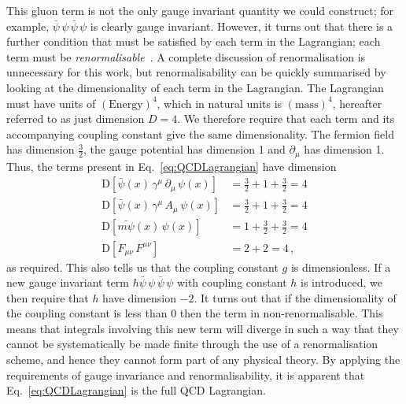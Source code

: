 This gluon term is not the only gauge invariant quantity we could construct; for example, $\bar{\psi}\,\psi\,\bar{\psi}\,\psi$ is clearly gauge invariant. However, it turns out that there is a further condition that must be satisfied by each term in the Lagrangian; each term must be \textit{renormalisable}~\cite{peskin2018introduction}. A complete discussion of renormalisation is unnecessary for this work, but renormalisability can be quickly summarised by looking at the dimensionality of each term in the Lagrangian. The Lagrangian must have units of $(\text{Energy})^4$, which in natural units is $(\text{mass})^4$,  hereafter referred to as just dimension $D=4$. We therefore require that each term and its accompanying coupling constant give the same dimensionality. The fermion field has dimension $\frac{3}{2}$, the gauge potential has dimension 1 and $\partial_\mu$ has dimension 1. Thus, the terms present in Eq.~\ref{eq:QCDLagrangian} have dimension
%
\begin{align*}
\text{D}[\bar{\psi}(x)\,\gamma^\mu\,\partial_\mu\,\psi(x)]&=\frac{3}{2}+1+\frac{3}{2}=4\\
\text{D}[\bar{\psi}(x)\,\gamma^\mu\,A_\mu\,\psi(x)]&=\frac{3}{2}+1+\frac{3}{2}=4\\
\text{D}[\bar{m\psi}(x)\,\psi(x)]&=1+\frac{3}{2}+\frac{3}{2}=4\\
\text{D}[F_{\mu\nu}\,F^{\mu\nu}] &= 2+2=4\, ,
\end{align*}
%
as required. This also tells us that the coupling constant $g$ is dimensionless. If a new gauge invariant term $h\bar{\psi}\,\psi\,\bar{\psi}\,\psi$ with coupling constant $h$ is introduced, we then require that $h$ have dimension $-2$. It turns out that if the dimensionality of the coupling constant is less than 0 then the term in non-renormalisable. This means that integrals involving this new term will diverge in such a way that they cannot be systematically be made finite through the use of a renormalisation scheme, and hence they cannot form part of any physical theory. By applying the requirements of gauge invariance and renormalisability, it is apparent that Eq.~\ref{eq:QCDLagrangian} is the full QCD Lagrangian.

